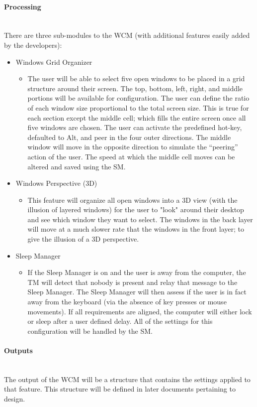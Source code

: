 \documentclass[titlepage]{article}
\newcommand{\myparagraph}[1]{\paragraph{#1}\mbox{}\\}
\begin{document}
\myparagraph{Processing}
There are three sub-modules to the WCM (with additional features easily added by the developers):
\begin{itemize}
	\item Windows Grid Organizer
	\begin{itemize}[label={}]
		\item The user will be able to select five open windows to be placed in a grid structure around their screen. The top, bottom, left, right, and middle portions will be available for configuration. The user can define the ratio of each window size proportional to the total screen size. This is true for each section except the middle cell; which fills the entire screen once all five windows are chosen. The user can activate the predefined hot-key, defaulted to Alt, and peer in the four outer directions. The middle window will move in the opposite direction to simulate the ``peering'' action of the user. The speed at which the middle cell moves can be altered and saved using the SM.
	\end{itemize}
	\item Windows Perspective (3D)
	\begin{itemize}[label={}]
		\item This feature will organize all open windows into a 3D view (with the illusion of layered windows) for the user to "look" around their desktop and see which window they want to select. The windows in the back layer will move at a much slower rate that the windows in the front layer; to give the illusion of a 3D perspective.
	\end{itemize}
	\item Sleep Manager
	\begin{itemize}[label={}]
		\item If the Sleep Manager is on and the user is away from the computer, the TM will detect that nobody is present and relay that message to the Sleep Manager. The Sleep Manager will then assess if the user is in fact away from the keyboard (via the absence of key presses or mouse movements). If all requirements are aligned, the computer will either lock or sleep after a user defined delay. All of the settings for this configuration will be handled by the SM.
	\end{itemize}
\end{itemize}

\myparagraph{Outputs}
The output of the WCM will be a structure that contains the settings applied to that feature. This structure will be defined in later documents pertaining to design.
\end{document}

